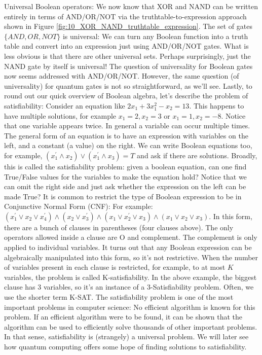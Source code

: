 \documentclass[main.tex]{subfiles}
\begin{document}
Universal Boolean operators: We now know that XOR and NAND can be written entirely in terms of AND/OR/NOT via the truthtable-to-expression approach shown in Figure \ref{fig:10_XOR_NAND_truthtable_expression}. The set of gates $\{AND, OR, NOT\}$ is universal: We can turn any Boolean function into a truth table and convert into an expression just using AND/OR/NOT gates. What is less obvious is that there are other universal sets. Perhaps surprisingly, just the NAND gate by itself is universal! The question of universality for Boolean gates now seems addressed with AND/OR/NOT. However, the same question (of universality) for quantum gates is not so straightforward, as we'll see. Lastly, to round out our quick overview of Boolean algebra, let's describe the problem of satisfiability: Consider an equation like $2 x_{1}+3 x_{1}^{2}-x_{2}=13$. This happens to have multiple solutions, for example $x_{1}=2, x_{2}=3$ or $x_{1}=1, x_{2}=-8$. Notice that one variable appears twice. In general a variable can occur multiple times. The general form of an equation is to have an expression with variables on the left, and a constant (a value) on the right. We can write Boolean equations too, for example, $\left(x_{1}^{\prime} \wedge x_{2}\right) \vee\left(x_{1}^{\prime} \wedge x_{3}\right)=T$ and ask if there are solutions. Broadly, this is called the satisfiability problem: given a boolean equation, can one find True/False values for the variables to make the equation hold? Notice that we can omit the right side and just ask whether the expression on the left can be made True? It is common to restrict the type of Boolean expression to be in Conjunctive Normal Form (CNF): For example:
$\left(x_{1}^{\prime} \vee x_{2} \vee x_{4}^{\prime}\right) \wedge\left(x_{2} \vee x_{3}^{\prime}\right) \wedge\left(x_{1} \vee x_{2}^{\prime} \vee x_{3}\right) \wedge\left(x_{1} \vee x_{2} \vee x_{3}\right)$. In this form, there are a bunch of clauses in parentheses (four clauses above). The only operators allowed inside a clause are $\mathrm{O}$ and complement. The complement is only applied to individual variables. It turns out that any Boolean expression can be algebraically manipulated into this form, so it's not restrictive. When the number of variables present in each clause is restricted, for example, to at most $K$ variables, the problem is called K-satisfiability. In the above example, the biggest clause has 3 variables, so it's an instance of a 3-Satisfiability problem. Often, we use the shorter term K-SAT. The satisfiability problem is one of the most important problems in computer science: No efficient algorithm is known for this problem. If an efficient algorithm were to be found, it can be shown that the algorithm can be used to efficiently solve thousands of other important problems. In that sense, satisfiability is (strangely) a universal problem. We will later see how quantum computing offers some hope of finding solutions to satisfiability.
\end{document}
